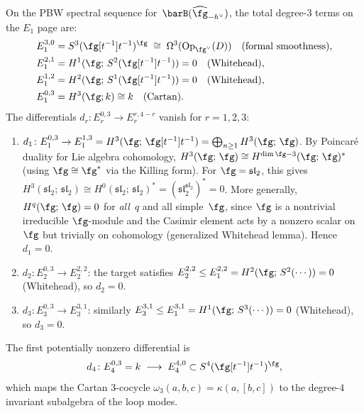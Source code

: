 \begin{proposition}
\label{prop:h3-differential-analysis}
On the PBW spectral sequence for~$\barB(\widehat{\fg}_{-h^\vee})$,
the total degree-$3$ terms on the $E_1$ page are:
\begin{align*}
E_1^{3,0} &= S^3(\fg[t^{-1}]t^{-1})^{\fg}
 \;\cong\; \Omega^3(\mathrm{Op}_{\fg^\vee}(D))
 \quad\text{(formal smoothness)}, \\
E_1^{2,1} &= H^1(\fg;\, S^2(\fg[t^{-1}]t^{-1})) = 0
 \quad\text{(Whitehead)}, \\
E_1^{1,2} &= H^2(\fg;\, S^1(\fg[t^{-1}]t^{-1})) = 0
 \quad\text{(Whitehead)}, \\
E_1^{0,3} &= H^3(\fg; k) \cong k
 \quad\text{(Cartan)}.
\end{align*}
The differentials $d_r\colon E_r^{0,3} \to E_r^{r, 4-r}$
vanish for $r = 1, 2, 3$:
\begin{enumerate}[label=\textup{(\roman*)}]
\item $d_1\colon E_1^{0,3} \to E_1^{1,3}
 = H^3(\fg;\, \fg[t^{-1}]t^{-1})
 = \bigoplus_{n \geq 1} H^3(\fg;\, \fg)$.
 By Poincar\'e duality for Lie algebra cohomology,
 $H^3(\fg;\, \fg) \cong H^{\dim\fg - 3}(\fg;\, \fg)^*$
 \textup{(}using $\fg \cong \fg^*$ via the Killing form\textup{)}.
 For $\fg = \mathfrak{sl}_2$, this gives
 $H^3(\mathfrak{sl}_2;\, \mathfrak{sl}_2) \cong H^0(\mathfrak{sl}_2;\, \mathfrak{sl}_2)^*
 = (\mathfrak{sl}_2^{\mathfrak{sl}_2})^* = 0$.
 More generally, $H^q(\fg;\, \fg) = 0$ for \emph{all}~$q$
 and all simple~$\fg$, since $\fg$ is a nontrivial irreducible
 $\fg$-module and the Casimir element acts by a nonzero scalar
 on~$\fg$ but trivially on cohomology
 \textup{(}generalized Whitehead lemma\textup{)}.
 Hence $d_1 = 0$.
\item $d_2\colon E_2^{0,3} \to E_2^{2,2}$: the target satisfies
 $E_2^{2,2} \leq E_1^{2,2} = H^2(\fg;\, S^2(\cdots)) = 0$
 \textup{(}Whitehead\textup{)}, so $d_2 = 0$.
\item $d_3\colon E_3^{0,3} \to E_3^{3,1}$: similarly
 $E_3^{3,1} \leq E_1^{3,1} = H^1(\fg;\, S^3(\cdots)) = 0$
 \textup{(}Whitehead\textup{)}, so $d_3 = 0$.
\end{enumerate}
The first potentially nonzero differential is
\begin{equation}\label{eq:d4-obstruction}
d_4\colon E_4^{0,3} = k
\;\longrightarrow\;
E_4^{4,0} \subset S^4(\fg[t^{-1}]t^{-1})^{\fg},
\end{equation}
which maps the Cartan $3$-cocycle
$\omega_3(a,b,c) = \kappa(a,[b,c])$ to the degree-$4$ invariant
subalgebra of the loop modes.
\end{proposition}

